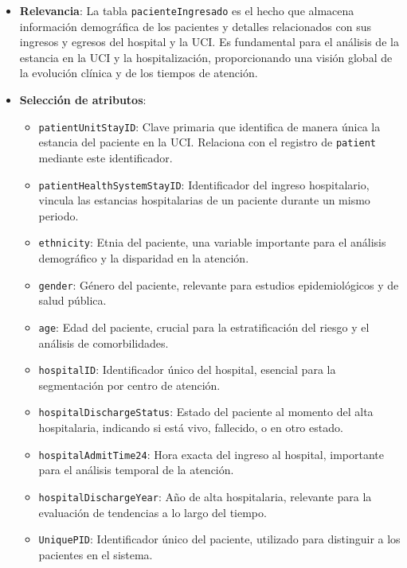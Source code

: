 \documentclass[12pt, a4paper, twoside]{article}
\begin{document}
	\begin{itemize}
		\item \textbf{Relevancia}: La tabla \texttt{pacienteIngresado} es el hecho que almacena información demográfica de los pacientes y detalles relacionados con sus ingresos y egresos del hospital y la UCI. Es fundamental para el análisis de la estancia en la UCI y la hospitalización, proporcionando una visión global de la evolución clínica y de los tiempos de atención.
		
		\item \textbf{Selección de atributos}:
		\begin{itemize}
			\item \texttt{patientUnitStayID}: Clave primaria que identifica de manera única la estancia del paciente en la UCI. Relaciona con el registro de \texttt{patient} mediante este identificador.
			\item \texttt{patientHealthSystemStayID}: Identificador del ingreso hospitalario, vincula las estancias hospitalarias de un paciente durante un mismo periodo.
			\item \texttt{ethnicity}: Etnia del paciente, una variable importante para el análisis demográfico y la disparidad en la atención.
			\item \texttt{gender}: Género del paciente, relevante para estudios epidemiológicos y de salud pública.
			\item \texttt{age}: Edad del paciente, crucial para la estratificación del riesgo y el análisis de comorbilidades.
			\item \texttt{hospitalID}: Identificador único del hospital, esencial para la segmentación por centro de atención.
			\item \texttt{hospitalDischargeStatus}: Estado del paciente al momento del alta hospitalaria, indicando si está vivo, fallecido, o en otro estado.
			\item \texttt{hospitalAdmitTime24}: Hora exacta del ingreso al hospital, importante para el análisis temporal de la atención.
			\item \texttt{hospitalDischargeYear}: Año de alta hospitalaria, relevante para la evaluación de tendencias a lo largo del tiempo.
			\item \texttt{UniquePID}: Identificador único del paciente, utilizado para distinguir a los pacientes en el sistema.
		\end{itemize}
		
	\end{itemize}
	
\end{document}
